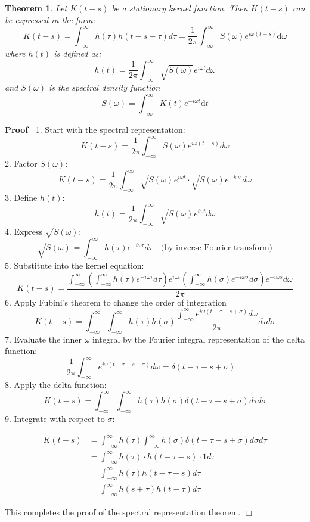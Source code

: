 \documentclass{article}
\newcommand{\mathd}{\mathrm{d}}
\newenvironment{proof}{\noindent\textbf{Proof\ }}{\hspace*{\fill}$\Box$\medskip}
\newtheorem{theorem}{Theorem}
\begin{document}
\begin{theorem}
  Let $K (t - s)$ be a stationary kernel function. Then $K (t - s)$ can be
  expressed in the form:
  \[ K (t - s) = \int_{- \infty}^{\infty} h (\tau) h (t - s - \tau) d \tau =
     \frac{1}{2 \pi} \int_{- \infty}^{\infty} S (\omega) e^{i \omega (t - s)}
     \mathd \omega \]
  where $h (t)$ is defined as:
  \[ h (t) = \frac{1}{2 \pi}  \int_{- \infty}^{\infty} \sqrt{S (\omega)} e^{i
     \omega t} d \omega \]
  and $S (\omega)$ is the spectral density function
  \begin{equation}
    S (\omega) = \int_{- \infty}^{\infty} K (t) e^{- i \omega t} \mathd t
  \end{equation}
\end{theorem}

\begin{proof}
  1. Start with the spectral representation:
  \[ K (t - s) = \frac{1}{2 \pi}  \int_{- \infty}^{\infty} S (\omega) e^{i
     \omega (t - s)} d \omega \]
  2. Factor $S (\omega)$:
  \[ K (t - s) = \frac{1}{2 \pi}  \int_{- \infty}^{\infty} \sqrt{S (\omega)}
     e^{i \omega t} \cdot \sqrt{S (\omega)} e^{- i \omega s} d \omega \]
  3. Define $h (t)$:
  \[ h (t) = \frac{1}{2 \pi}  \int_{- \infty}^{\infty} \sqrt{S (\omega)} e^{i
     \omega t} d \omega \]
  4. Express $\sqrt{S (\omega)}$:
  \[ \sqrt{S (\omega)} = \int_{- \infty}^{\infty} h (\tau) e^{- i \omega \tau}
     d \tau \quad \text{(by inverse Fourier transform)} \]
  5. Substitute into the kernel equation:
  \[ K (t - s) = \frac{\int_{- \infty}^{\infty} \left( \int_{-
     \infty}^{\infty} h (\tau) e^{- i \omega \tau} d \tau \right) e^{i \omega
     t} \left( \int_{- \infty}^{\infty} h (\sigma) e^{- i \omega \sigma} d
     \sigma \right) e^{- i \omega s} d \omega}{2 \pi} \]
  6. Apply Fubini's theorem to change the order of integration
  \[ K (t - s) = \int_{- \infty}^{\infty} \int_{- \infty}^{\infty} h (\tau) h
     (\sigma) \frac{\int_{- \infty}^{\infty} e^{i \omega (t - \tau - s +
     \sigma)} d \omega}{2 \pi} d \tau d \sigma \]
  7. Evaluate the inner $\omega$ integral by the Fourier integral
  representation of the delta function:
  \[ \frac{1}{2 \pi}  \int_{- \infty}^{\infty} e^{i \omega (t - \tau - s +
     \sigma)} d \omega = \delta (t - \tau - s + \sigma) \quad \]
  8. Apply the delta function:
  \[ K (t - s) = \int_{- \infty}^{\infty} \int_{- \infty}^{\infty} h (\tau) h
     (\sigma) \delta (t - \tau - s + \sigma) d \tau d \sigma \]
  9. Integrate with respect to $\sigma$:
  
  \begin{align*}
    K (t - s) & = \int_{- \infty}^{\infty} h (\tau)  \int_{- \infty}^{\infty}
    h (\sigma) \delta (t - \tau - s + \sigma) d \sigma d \tau\\
    & = \int_{- \infty}^{\infty} h (\tau) \cdot h (t - \tau - s) \cdot 1 d
    \tau\\
    & = \int_{- \infty}^{\infty} h (\tau) h (t - \tau - s) d \tau\\
    & = \int_{- \infty}^{\infty} h (s + \tau) h (t - \tau) d \tau
  \end{align*}
  
  This completes the proof of the spectral representation theorem.
\end{proof}
\end{document}
